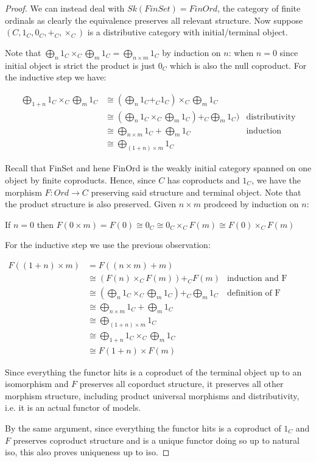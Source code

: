 \begin{proof}
We can instead deal with $Sk(FinSet) = FinOrd$, the category of finite ordinals as clearly the equivalence preserves all relevant structure. Now suppose $(C, 1_C, 0_C, +_C, \times_C)$ is a distributive category with initial/terminal object. 

Note that $\bigoplus_{n} 1_C \times_C \bigoplus_m 1_C = \bigoplus_{n \times m} 1_C$ by induction on $n$: when $n=0$ since initial object is strict the product is just $0_C$ which is also the null coproduct. For the inductive step we have:

\begin{align*}
\bigoplus_{1+n} 1_C \times_C \bigoplus_{m} 1_C &\cong (\bigoplus_n 1_C +_C 1_C) \times_C \bigoplus_m 1_C  \\
&\cong (\bigoplus_n 1_C \times_C \bigoplus_m 1_C)  +_C  \bigoplus_m 1_C ) &\text{distributivity} \\
&\cong \bigoplus_{n \times m} 1_C + \bigoplus_m 1_C &\text{induction}\\
&\cong \bigoplus_{(1+n) \times m} 1_C  
\end{align*}

Recall that FinSet and hene FinOrd is the weakly initial category spanned on one object by finite coproducts. Hence, since $C$ has coproducts and $1_C$, we have the morphism $F \colon Ord \to C$ preserving said structure and terminal object. Note that the product structure is also preserved. Given $n \times m$ prodceed by induction on $n$: 

If $n = 0$ then $F(0 \times m) = F(0) \cong 0_C \cong 0_C \times_C F(m) \cong F(0) \times_C F(m)$

For the inductive step we use the previous observation:

\begin{align*}
    F((1+n) \times m) &= F((n \times m) + m) \\
    &\cong (F(n) \times_C F(m)) +_C F(m) &\text{induction and F preserves coproducts} \\
    &\cong (\bigoplus_n 1_C \times_C \bigoplus_m 1_C) +_C \bigoplus_m 1_C &\text{definition of F}\\
    &\cong \bigoplus_{n \times m} 1_C + \bigoplus_m 1_C \\
    &\cong \bigoplus_{(1+n) \times m} 1_C \\
    &\cong \bigoplus_{1+n} 1_C \times_C \bigoplus_m 1_C \\
    &\cong F(1+n) \times F(m)
\end{align*}

Since everything the functor hits is a coproduct of the terminal object up to an isomorphism and $F$ preserves all coporduct structure, it preserves all other morphism structure, including product universal morphisms and distributivity, i.e. it is an actual functor of models.

By the same argument, since everything the functor hits is a coproduct of $1_C$ and $F$ preserves coproduct structure and is a unique functor doing so up to natural iso, this also proves uniqueness up to iso.
\end{proof}

